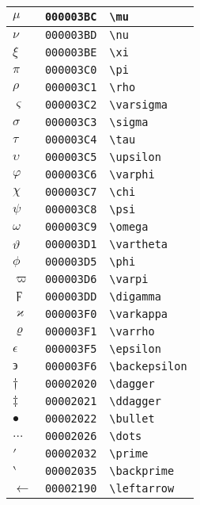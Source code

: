 \begin{longtable}{|l|l|l|}
\hline
$\mu$ & \texttt{000003BC} & \verb|\mu| \\
\hline
$\nu$ & \texttt{000003BD} & \verb|\nu| \\
\hline
$\xi$ & \texttt{000003BE} & \verb|\xi| \\
\hline
$\pi$ & \texttt{000003C0} & \verb|\pi| \\
\hline
$\rho$ & \texttt{000003C1} & \verb|\rho| \\
\hline
$\varsigma$ & \texttt{000003C2} & \verb|\varsigma| \\
\hline
$\sigma$ & \texttt{000003C3} & \verb|\sigma| \\
\hline
$\tau$ & \texttt{000003C4} & \verb|\tau| \\
\hline
$\upsilon$ & \texttt{000003C5} & \verb|\upsilon| \\
\hline
$\varphi$ & \texttt{000003C6} & \verb|\varphi| \\
\hline
$\chi$ & \texttt{000003C7} & \verb|\chi| \\
\hline
$\psi$ & \texttt{000003C8} & \verb|\psi| \\
\hline
$\omega$ & \texttt{000003C9} & \verb|\omega| \\
\hline
$\vartheta$ & \texttt{000003D1} & \verb|\vartheta| \\
\hline
$\phi$ & \texttt{000003D5} & \verb|\phi| \\
\hline
$\varpi$ & \texttt{000003D6} & \verb|\varpi| \\
\hline
$\digamma$ & \texttt{000003DD} & \verb|\digamma| \\
\hline
$\varkappa$ & \texttt{000003F0} & \verb|\varkappa| \\
\hline
$\varrho$ & \texttt{000003F1} & \verb|\varrho| \\
\hline
$\epsilon$ & \texttt{000003F5} & \verb|\epsilon| \\
\hline
$\backepsilon$ & \texttt{000003F6} & \verb|\backepsilon| \\
\hline
$\dagger$ & \texttt{00002020} & \verb|\dagger| \\
\hline
$\ddagger$ & \texttt{00002021} & \verb|\ddagger| \\
\hline
$\bullet$ & \texttt{00002022} & \verb|\bullet| \\
\hline
$\dots$ & \texttt{00002026} & \verb|\dots| \\
\hline
$\prime$ & \texttt{00002032} & \verb|\prime| \\
\hline
$\backprime$ & \texttt{00002035} & \verb|\backprime| \\
\hline
$\leftarrow$ & \texttt{00002190} & \verb|\leftarrow| \\

\end{longtable}
